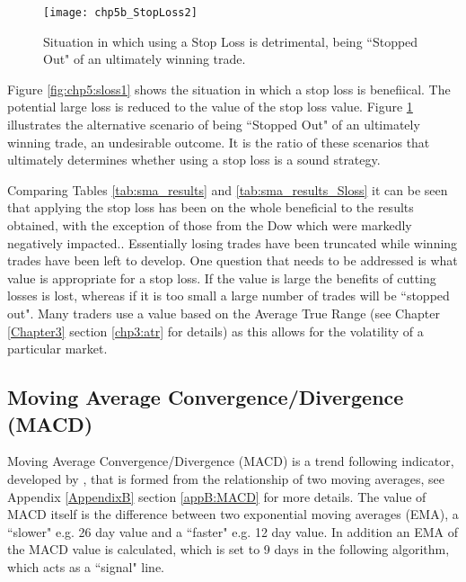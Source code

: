 \begin{figure}[tbph]
\centering
\texttt{[image: chp5b\_StopLoss2]}
\caption[ Stop Loss.]{Situation in which using a Stop Loss is detrimental, being \textquotedblleft Stopped Out" of an ultimately winning trade.}
\label{fig:chp5:sloss2}
\end{figure}




Figure \ref{fig:chp5:sloss1} shows the situation in which a stop loss is benefiical. The potential large loss is reduced to the value of the stop loss value. Figure \ref{fig:chp5:sloss2} illustrates the alternative scenario of being \textquotedblleft Stopped Out" of an ultimately winning trade, an undesirable outcome. It is the ratio of these scenarios that ultimately determines whether using a stop loss is a sound strategy.



Comparing Tables \ref{tab:sma_results} and \ref{tab:sma_results_Sloss}
it can be seen that applying the stop loss has been on the whole beneficial to the results obtained, with the exception of those from the Dow which were markedly negatively impacted.. Essentially losing trades have been truncated while winning trades have been left to develop. One question that needs to be addressed is what value is appropriate for a stop loss. If the value is large the benefits of cutting losses is lost, whereas if it is too small a large number of trades will be \textquotedblleft stopped out". Many traders use a value based on the Average True Range (see Chapter \ref{Chapter3} section \ref{chp3:atr} for details) as this allows for the volatility of a particular market.

\subsection{Moving Average Convergence/Divergence (MACD)}

Moving Average Convergence/Divergence (MACD) is a trend following indicator, developed by \cite{appel2005technical}, that is formed from the relationship of two moving averages, see Appendix \ref{AppendixB} section \ref{appB:MACD} for more details. The value of MACD itself is the difference between two exponential moving averages (EMA), a \textquotedblleft slower" e.g. 26 day value and a \textquotedblleft faster" e.g. 12 day value. In addition an EMA of the MACD value is calculated, which is set to 9 days in the following algorithm, which acts as a \textquotedblleft signal" line.
 

